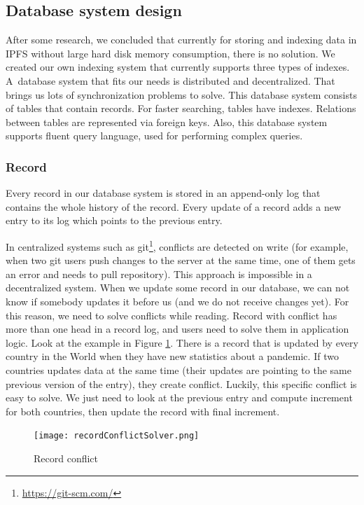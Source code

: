 \subsection{Database system design}
After some research, we concluded that currently for storing and indexing data in IPFS without large hard disk memory consumption, there is no solution. We created our own indexing system that currently supports three types of indexes. A~database system that fits our needs is distributed and decentralized. That brings us lots of synchronization problems to solve. This database system consists of tables that contain records. For faster searching, tables have indexes. Relations between tables are represented via foreign keys. Also, this database system supports fluent query language, used for performing complex queries.

\subsubsection{Record} 
Every record in our database system is stored in an append-only log that contains the whole history of the record. Every update of a record adds a new entry to its log which points to the previous entry. 

In centralized systems such as git\footnote{\url{https://git-scm.com/}}, conflicts are detected on write (for example, when two git users push changes to the server at the same time, one of them gets an error and needs to pull repository)\cite{chacon2014pro}. This approach is impossible in a decentralized system. When we update some record in our database, we can not know if somebody updates it before us (and we do not receive changes yet). For this reason, we need to solve conflicts while reading. Record with conflict has more than one head in a record log, and users need to solve them in application logic. Look at the example in Figure \ref{recordConflict}. There is a record that is updated by every country in the World when they have new statistics about a pandemic. If two countries updates data at the same time (their updates are pointing to the same previous version of the entry), they create conflict. Luckily, this specific conflict is easy to solve. We just need to look at the previous entry and compute increment for both countries, then update the record with final increment.


\begin{figure}[h]
    \centering
    \texttt{[image: recordConflictSolver.png]}
    \caption{Record conflict}
    \label{recordConflict}
\end{figure}


